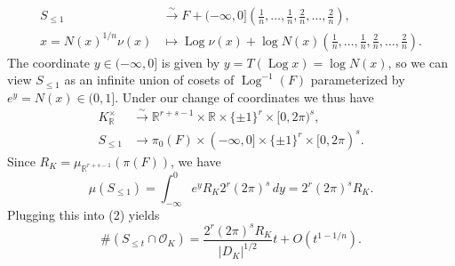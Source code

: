 \documentclass[UTF8,11pt]{ctexart}
\theoremstyle{definition}
\newcommand{\R}{\mathbb R}
\begin{document}
\begin{align*}
S_{\leq1}&\xrightarrow{\sim}F+(-\infty,0]\left(\tfrac1n,\ldots,\tfrac1n,\tfrac2n,\ldots,\tfrac2n\right),\\
x=N(x)^{1/n}\nu(x)&\longmapsto\operatorname{Log}\nu(x)+\log N(x)\left(\tfrac1n,\ldots,\tfrac1n,\tfrac2n,\ldots,\tfrac2n\right).
\end{align*}
The coordinate $y\in(-\infty,0]$ is given by $y=T(\operatorname{Log}x)=\log N(x)$, so we can view $S_{\leq1}$ as an infinite union of cosets of $\operatorname{Log}^{-1}(F)$ parameterized by $e^y=N(x)\in(0,1]$. Under our change of coordinates we thus have
\[
\begin{aligned}
K_\R^\times&\xrightarrow{\sim}\R^{r+s-1}\times\R\times\{\pm1\}^r\times[0,2\pi)^s,\\
S_{\leq1}&\longrightarrow\pi_0(F)\times(-\infty,0]\times\{\pm1\}^r\times[0,2\pi)^s.
\end{aligned}
\]
Since $R_K=\mu_{\R^{r+s-1}}(\pi(F))$, we have
\[
\mu(S_{\leq1})=\int_{-\infty}^0 e^y R_K2^r(2\pi)^s\,dy=2^r(2\pi)^sR_K.
\]
Plugging this into (2) yields
\[
\#(S_{\leq t}\cap\mathcal O_K)=\frac{2^r(2\pi)^sR_K}{|D_K|^{1/2}}t+O(t^{1-1/n}).\tag{3}
\]
\end{document}
